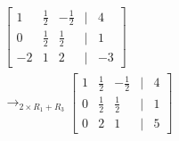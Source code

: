 \documentclass[preview]{standalone}
\begin{document}
\begin{align*}
\begin{bmatrix} 1 & \frac{1}{2} & -\frac{1}{2} & | & 4 \\ 0 & \frac{1}{2} & \frac{1}{2} & | & 1 \\ -2 & 1 & 2 & | & -3 \end{bmatrix}\\ \rightarrow_{2\times R_1 + R_3} \begin{bmatrix} 1 & \frac{1}{2} & -\frac{1}{2} & | & 4 \\ 0 & \frac{1}{2} & \frac{1}{2} & | & 1 \\ 0 & 2 & 1 & | & 5 \end{bmatrix}
\end{align*}
\end{document}
